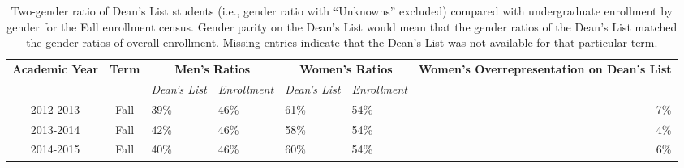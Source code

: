 \documentclass[10pt]{article}
\begin{document}
\begin{longtable}[c]{|c|c|ll|ll|r|}
	\caption{Two-gender ratio of Dean's List students (i.e., gender ratio with ``Unknowns'' excluded) compared with undergraduate enrollment by gender for the Fall enrollment census. Gender parity on the Dean's List would mean that the gender ratios of the Dean's List matched the gender ratios of overall enrollment.  Missing entries indicate that the Dean's List was not available for that particular term.}
	\label{tab:gender-benchmark}\\
	\hline
	\multicolumn{1}{|c|}{\multirow{2}{*}{\textbf{Academic Year}}} & \multicolumn{1}{c|}{\multirow{2}{*}{\textbf{Term}}} & \multicolumn{2}{c|}{\textbf{Men's Ratios}}                                           & \multicolumn{2}{c|}{\textbf{Women's Ratios}}                                         & \multicolumn{1}{c|}{\multirow{2}{*}{\parbox{1.75in}{\textbf{Women's Overrepresentation on Dean's List}}}} \\ \cline{3-6}
	\multicolumn{1}{|c|}{}                                        & \multicolumn{1}{c|}{}                               & \multicolumn{1}{c|}{\textit{Dean's List}} & \multicolumn{1}{c|}{\textit{Enrollment}} & \multicolumn{1}{c|}{\textit{Dean's List}} & \multicolumn{1}{c|}{\textit{Enrollment}} & \multicolumn{1}{c|}{}                                                                    \\ \hline
	\endhead
	2012-2013                                                     & Fall                                                & \multicolumn{1}{l|}{39\%}                 & 46\%                                     & \multicolumn{1}{l|}{61\%}                 & 54\%                                     & 7\%                                                                                      \\ \hline
	2013-2014                                                     & Fall                                                & \multicolumn{1}{l|}{42\%}                 & 46\%                                     & \multicolumn{1}{l|}{58\%}                 & 54\%                                     & 4\%                                                                                      \\ \hline
	2014-2015                                                     & Fall                                                & \multicolumn{1}{l|}{40\%}                 & 46\%                                     & \multicolumn{1}{l|}{60\%}                 & 54\%                                     & 6\%                                                                                      \\ \hline

\end{longtable}
\end{document}
